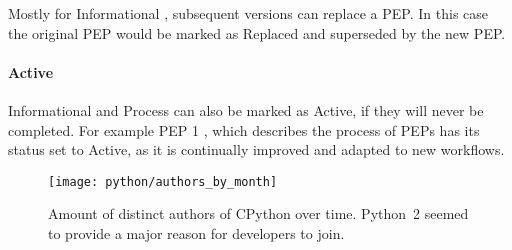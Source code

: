 Mostly for Informational , subsequent versions can replace a
\ac{PEP}. In this case the original \ac{PEP} would be marked as Replaced and
superseded by the new \ac{PEP}.

\paragraph{Active}

Informational and Process  can also be marked as Active, if they will never
be completed. For example \ac{PEP} 1 \cite{Warsaw2000}, which describes the
process of \acp{PEP} has its status set to Active, as it is continually
improved and adapted to new workflows.

\begin{figure}[htbp]
  \centering
  \texttt{[image: python/authors\_by\_month]}
  \caption[Authors by Month, Python]
  {Amount of distinct authors of CPython over time. Python~2 seemed to provide
    a major reason for developers to join.}
\end{figure}


